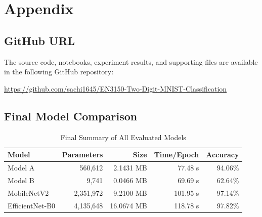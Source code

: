 \documentclass[12pt,a4paper]{report}
\begin{document}

\appendix

\chapter{Appendix}

\section{GitHub URL}

The source code, notebooks, experiment results, and supporting
files are available in the following GitHub repository:

\begin{center}

\url{https://github.com/sachi1645/EN3150-Two-Digit-MNIST-Classification}

\end{center}



\section{Final Model Comparison}

\begin{table}[H]
\centering
\caption{Final Summary of All Evaluated Models}
\label{tab:final-summary}

\begin{tabular}{lrrrr}
\toprule
\textbf{Model}
&
\textbf{Parameters}
&
\textbf{Size}
&
\textbf{Time/Epoch}
&
\textbf{Accuracy}
\\
\midrule

Model A
&
560,612
&
2.1431 MB
&
77.48 s
&
94.06\%
\\

Model B
&
9,741
&
0.0466 MB
&
69.69 s
&
62.64\%
\\

MobileNetV2
&
2,351,972
&
9.2100 MB
&
101.95 s
&
97.14\%
\\

EfficientNet-B0
&
4,135,648
&
16.0674 MB
&
118.78 s
&
97.82\%
\\

\bottomrule
\end{tabular}

\end{table}



\end{document}
